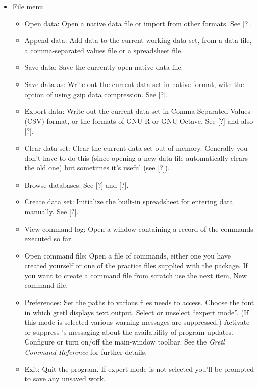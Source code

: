 \begin{itemize}
\item \textsf{File menu}
  \begin{itemize}
  \item \textsf{Open data}: Open a native  data file or
    import from other formats.  See [?].
  \item \textsf{Append data}: Add data to the current working data
    set, from a  data file, a comma-separated values file
    or a spreadsheet file.
  \item \textsf{Save data}: Save the currently open native 
    data file.
  \item \textsf{Save data as}: Write out the current data set in
    native format, with the option of using gzip data compression. See
    [?].
  \item \textsf{Export data}: Write out the current data set in Comma
    Separated Values (CSV) format, or the formats of GNU R or GNU
    Octave. See [?] and also [?].
  \item \textsf{Clear data set}: Clear the current data set out of
    memory.  Generally you don't have to do this (since opening a new
    data file automatically clears the old one) but sometimes it's
    useful (see [?]).
  \item \textsf{Browse databases}: See [?] and [?].
  \item \textsf{Create data set}: Initialize the built-in spreadsheet
    for entering data manually.  See [?].
  \item \textsf{View command log}: Open a window containing a record
    of the commands executed so far.
  \item \textsf{Open command file}: Open a file of 
    commands, either one you have created yourself or one of the
    practice files supplied with the package.  If you want to create a
    command file from scratch use the next item, \textsf{New command
      file}.
  \item \textsf{Preferences}: Set the paths to various files
     needs to access. Choose the font in which gretl
    displays text output.  Select or unselect ``expert mode''. (If
    this mode is selected various warning messages are suppressed.)
    Activate or suppress 's messaging about the
    availability of program updates.  Configure or turn on/off the
    main-window toolbar. See the \emph{Gretl Command Reference} for
    further details.
  \item \textsf{Exit}: Quit the program. If expert mode is not
    selected you'll be prompted to save any unsaved work.
  \end{itemize}


\end{itemize}
